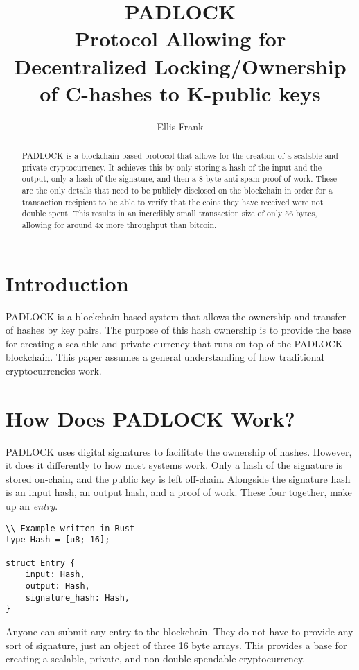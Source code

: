 \documentclass[12pt, letterpaper]{article}
\title{%
    PADLOCK \\
    \large Protocol Allowing for Decentralized Locking/Ownership of C-hashes to
    K-public keys
}
\author{Ellis Frank}
\begin{document}
\maketitle

\begin{abstract}
    PADLOCK is a blockchain based protocol that allows for the creation of a
    scalable and private cryptocurrency. It achieves this by only storing a hash
    of the input and the output, only a hash of the signature, and then a 8 byte
    anti-spam proof of work. These are the only details that need to be publicly
    disclosed on the blockchain in order for a transaction recipient to be able
    to verify that the coins they have received were not double spent. This
    results in an incredibly small transaction size of only 56 bytes, allowing
    for around 4x more throughput than bitcoin.
\end{abstract}


\section{Introduction}
PADLOCK is a blockchain based system that allows the ownership and transfer of
hashes by key pairs. The purpose of this hash ownership is to provide the base
for creating a scalable and private currency that runs on top of the PADLOCK
blockchain. This paper assumes a general understanding of how traditional
cryptocurrencies work.

\section{How Does PADLOCK Work?}
PADLOCK uses digital signatures to facilitate the ownership of hashes. However,
it does it differently to how most systems work. Only a hash of the signature is
stored on-chain, and the public key is left off-chain. Alongside the signature
hash is an input hash, an output hash, and a proof of work. These four together,
make up an \textit{entry}.

\begin{verbatim}
\\ Example written in Rust
type Hash = [u8; 16];

struct Entry {
    input: Hash,
    output: Hash,
    signature_hash: Hash,
}
\end{verbatim}

Anyone can submit any entry to the blockchain. They do not have to provide any
sort of signature, just an object of three 16 byte arrays. This provides a base
for creating a scalable, private, and non-double-spendable cryptocurrency.
\end{document}
